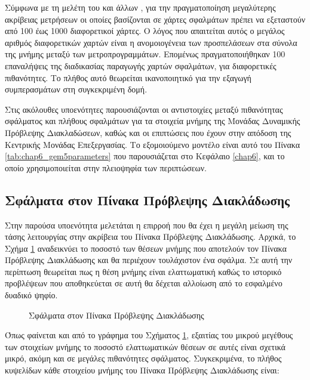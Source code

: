 Σύμφωνα με τη μελέτη του  και άλλων \cite{sanchez2011analytical}, για την πραγματοποίηση μεγαλύτερης ακρίβειας μετρήσεων οι οποίες βασίζονται σε χάρτες σφαλμάτων πρέπει να εξεταστούν από 100 έως 1000 διαφορετικοί χάρτες. Ο λόγος που απαιτείται αυτός ο μεγάλος αριθμός διαφορετικών χαρτών είναι η ανομοιογένεια των προσπελάσεων στα σύνολα της μνήμης μεταξύ των μετροπρογραμμάτων. Επομένως πραγματοποιήθηκαν 100 επαναλήψεις της διαδικασίας παραγωγής χαρτών σφαλμάτων, για διαφορετικές πιθανότητες. Το πλήθος αυτό θεωρείται ικανοποιητικό για την εξαγωγή συμπερασμάτων στη συγκεκριμένη δομή.
\par
Στις ακόλουθες υποενότητες παρουσιάζονται οι αντιστοιχίες μεταξύ πιθανότητας σφάλματος και πλήθους σφαλμάτων για τα στοιχεία μνήμης της Μονάδας Δυναμικής Πρόβλεψης Διακλαδώσεων, καθώς και οι επιπτώσεις που έχουν στην απόδοση της Κεντρικής Μονάδας Επεξεργασίας. Το εξομοιούμενο μοντέλο είναι αυτό του Πίνακα \ref{tab:chap6_gem5parameters} που παρουσιάζεται στο Κεφάλαιο \ref{chap6}, και το οποίο χρησιμοποιείται στην πλειοψηφία των περιπτώσεων.


\subsection{Σφάλματα στον Πίνακα Πρόβλεψης Διακλάδωσης}
\label{chap4_BranchPredictorFaults}

Στην παρούσα υποενότητα μελετάται η επιρροή που θα έχει η μεγάλη μείωση της τάσης λειτουργίας στην ακρίβεια του Πίνακα Πρόβλεψης Διακλάδωσης. Αρχικά, το Σχήμα \ref{fig:chap4_bpu_fmaps} αναδεικνύει το ποσοστό των θέσεων μνήμης που αποτελούν τον Πίνακα Πρόβλεψης Διακλάδωσης και θα περιέχουν τουλάχιστον ένα σφάλμα. Σε αυτή την περίπτωση θεωρείται πως η θέση μνήμης είναι ελαττωματική καθώς το ιστορικό προβλέψεων που αποθηκεύεται σε αυτή θα δέχεται αλλοίωση από το εσφαλμένο δυαδικό ψηφίο.

\begin{figure}[ht]
    \centering
    \caption{Σφάλματα στον Πίνακα Πρόβλεψης Διακλάδωσης}
    \label{fig:chap4_bpu_fmaps}
\end{figure}

Όπως φαίνεται και από το γράφημα του Σχήματος \ref{fig:chap4_bpu_fmaps}, εξαιτίας του μικρού μεγέθους των στοιχείων μνήμης το ποσοστό ελαττωματικών θέσεων σε αυτές είναι σχετικά μικρό, ακόμη και σε μεγάλες πιθανότητες σφάλματος. Συγκεκριμένα, το πλήθος κυψελίδων κάθε στοιχείου μνήμης του Πίνακα Πρόβλεψης Διακλάδωσης είναι:

